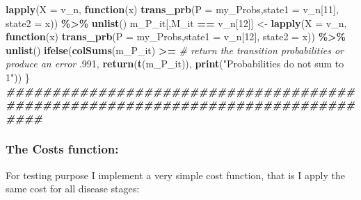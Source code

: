\documentclass[
]{article}
\newenvironment{Shaded}{\begin{snugshade}}{\end{snugshade}}
\newcommand{\AttributeTok}[1]{\textcolor[rgb]{0.13,0.29,0.53}{#1}}
\newcommand{\CommentTok}[1]{\textcolor[rgb]{0.56,0.35,0.01}{\textit{#1}}}
\newcommand{\ControlFlowTok}[1]{\textcolor[rgb]{0.13,0.29,0.53}{\textbf{#1}}}
\newcommand{\DecValTok}[1]{\textcolor[rgb]{0.00,0.00,0.81}{#1}}
\newcommand{\DocumentationTok}[1]{\textcolor[rgb]{0.56,0.35,0.01}{\textbf{\textit{#1}}}}
\newcommand{\FunctionTok}[1]{\textcolor[rgb]{0.13,0.29,0.53}{\textbf{#1}}}
\newcommand{\NormalTok}[1]{#1}
\newcommand{\OtherTok}[1]{\textcolor[rgb]{0.56,0.35,0.01}{#1}}
\newcommand{\SpecialCharTok}[1]{\textcolor[rgb]{0.81,0.36,0.00}{\textbf{#1}}}
\newcommand{\StringTok}[1]{\textcolor[rgb]{0.31,0.60,0.02}{#1}}
\begin{document}
\begin{Shaded}
\begin{Highlighting}[]
    \FunctionTok{lapply}\NormalTok{(}\AttributeTok{X =}\NormalTok{ v\_n, }\ControlFlowTok{function}\NormalTok{(x) }\FunctionTok{trans\_prb}\NormalTok{(}\AttributeTok{P =}\NormalTok{ my\_Probs,}\AttributeTok{state1 =}\NormalTok{ v\_n[}\DecValTok{11}\NormalTok{], }\AttributeTok{state2 =}\NormalTok{ x)) }\SpecialCharTok{\%\textgreater{}\%} 
    \FunctionTok{unlist}\NormalTok{()}
\NormalTok{  m\_P\_it[,M\_it }\SpecialCharTok{==}\NormalTok{ v\_n[}\DecValTok{12}\NormalTok{]]  }\OtherTok{\textless{}{-}} 
    \FunctionTok{lapply}\NormalTok{(}\AttributeTok{X =}\NormalTok{ v\_n, }\ControlFlowTok{function}\NormalTok{(x) }\FunctionTok{trans\_prb}\NormalTok{(}\AttributeTok{P =}\NormalTok{ my\_Probs,}\AttributeTok{state1 =}\NormalTok{ v\_n[}\DecValTok{12}\NormalTok{], }\AttributeTok{state2 =}\NormalTok{ x)) }\SpecialCharTok{\%\textgreater{}\%} 
    \FunctionTok{unlist}\NormalTok{() }
  \FunctionTok{ifelse}\NormalTok{(}\FunctionTok{colSums}\NormalTok{(m\_P\_it) }\SpecialCharTok{\textgreater{}=}  \CommentTok{\# return the transition probabilities or produce an error}
\NormalTok{           .}\DecValTok{991}\NormalTok{, }\FunctionTok{return}\NormalTok{(}\FunctionTok{t}\NormalTok{(m\_P\_it)), }\FunctionTok{print}\NormalTok{(}\StringTok{"Probabilities do not sum to 1"}\NormalTok{)) }
\NormalTok{\}       }
\DocumentationTok{\#\#\#\#\#\#\#\#\#\#\#\#\#\#\#\#\#\#\#\#\#\#\#\#\#\#\#\#\#\#\#\#\#\#\#\#\#\#\#\#\#\#\#\#\#\#\#\#\#\#\#\#\#\#\#\#\#\#\#\#\#\#\#\#\#\#\#\#\#\#\#\#\#\#\#\#\#\#\#\#}
\end{Highlighting}
\end{Shaded}

\hypertarget{the-costs-function}{%
\subsubsection{The Costs function:}\label{the-costs-function}}

For testing purpose I implement a very simple cost function, that is I
apply the same cost for all disease stages:
\end{document}
